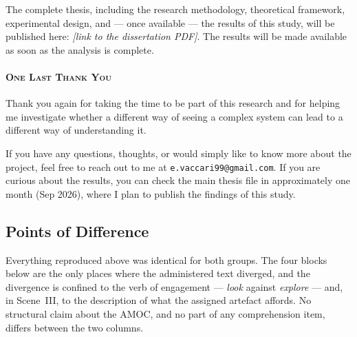 The complete thesis, including the research methodology, theoretical framework, experimental
design, and --- once available --- the results of this study, will be published here:
\emph{[link to the dissertation PDF]}. The results will be made available as soon as the
analysis is complete.

\paragraph{\textsc{One Last Thank You}}
Thank you again for taking the time to be part of this research and for helping me investigate
whether a different way of seeing a complex system can lead to a different way of understanding
it.

If you have any questions, thoughts, or would simply like to know more about the project, feel
free to reach out to me at \texttt{e.vaccari99@gmail.com}. If you are curious about the
results, you can check the main thesis file in approximately one month (Sep 2026), where I plan
to publish the findings of this study.

\normalsize

\subsection{Points of Difference}
\label{subsec:b-difference}

Everything reproduced above was identical for both groups. The four blocks below are the only
places where the administered text diverged, and the divergence is confined to the verb of
engagement --- \emph{look} against \emph{explore} --- and, in Scene~III, to the description of
what the assigned artefact affords. No structural claim about the AMOC, and no part of any
comprehension item, differs between the two columns.

